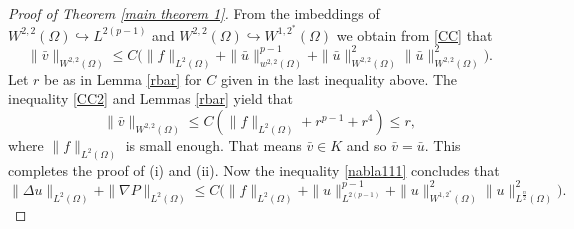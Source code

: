 \documentclass[10pt,a4paper]{amsart}
\numberwithin{equation}{section}
\begin{document}
\begin{proof}[Proof of Theorem \ref{main theorem 1}]
From the  imbeddings of  \(W^{2,2}(\Omega)\hookrightarrow L^{2(p-1)}\) and
\(W^{2,2}(\Omega)\hookrightarrow W^{1,2^*}(\Omega)\)  we obtain from \eqref{CC}
that
\begin{equation}\label{CC2}
  \rVert \bar{v} \rVert_{ W^{2,2}(\Omega)}
  \leq C\big( \rVert f\rVert_{L^2(\Omega)}+\rVert \bar{u}\rVert^{p-1}_{w^{2,2}(\Omega)}
  +\rVert \bar{u}\rVert^{2}_{W^{2,2}(\Omega)} \rVert  \bar{u}\rVert^2_{W^{2,2}(\Omega)}
  \big).
\end{equation}
Let $r$ be as in Lemma \ref{rbar} for $C$ given in the last inequality above.
The inequality \eqref{CC2} and Lemmas \ref{rbar} yield that
\[
  \rVert \bar{v} \rVert_{ W^{2,2}(\Omega)}
\leq   C(\rVert f\rVert_{L^2(\Omega)} +{r}^{p-1}+{r}^4)\leq {r},
\]
where \(\rVert f\rVert_{L^2(\Omega)}\) is small enough.
That means \( \bar{v}\in K\) and so $\bar{v}=\bar{u}$.
This completes the proof of (i) and (ii).
Now  the inequality \eqref{nabla111}  concludes that
  \begin{equation} 
  \rVert \Delta {u} \rVert_{L^2(\Omega)}+\rVert \nabla P \rVert_{L^2(\Omega)}
  \leq C\big( \rVert f\rVert_{L^2(\Omega)}+\rVert u\rVert^{p-1}_{L^{2(p-1)}}
  +\rVert {u}\rVert^{2}_{W^{1,2^*}(\Omega)}
  \rVert  {u}\rVert^2_{L^{\frac{n}{2}}(\Omega)} \big) .
\end{equation}
\end{proof}
\end{document}
